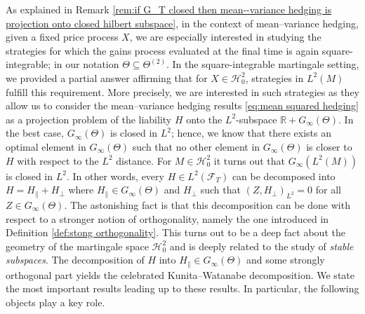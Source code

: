 \documentclass[11pt,a4paper,twoside,openany]{report}
\numberwithin{equation}{section}
\theoremstyle{plain} %
\theoremstyle{definition} %
\theoremstyle{remark} %
\begin{document}
As explained in Remark \ref{rem:if G_T closed then mean--variance hedging is projection onto closed hilbert subspace}, in the context of mean--variance hedging, given a fixed price process \(X\), we are especially interested in studying the strategies for which the gains process evaluated at the final time is again square-integrable; in our notation \(\Theta\subseteq\Theta^{(2)}\). In the square-integrable martingale setting, we provided a partial answer affirming that for \(X\in\mathcal{H}^2_0\), strategies in \(L^2(M)\) fulfill this requirement. More precisely, we are interested in such strategies as they allow us to consider the mean--variance hedging results \eqref{eq:mean squared hedging} as a projection problem of the liability \(H\) onto the \(L^2\)-subspace \(\mathbb{R}+G_\infty(\Theta)\). In the best case, \(G_\infty(\Theta)\) is closed in \(L^2\); hence, we know that there exists an optimal element in \(G_{\infty}(\Theta)\) such that no other element in \(G_{\infty}(\Theta)\) is closer to \(H\) with respect to the \(L^2\) distance. For \(M\in\mathcal{H}^2_0\) it turns out that \(G_{\infty}(L^2(M))\) is closed in \(L^2\). In other words, every \(H\in L^2(\mathcal{F}_T)\) can be decomposed into \(H=H_{\parallel}+H_{\perp}\) where \(H_{\parallel}\in G_{\infty}(\Theta)\) and  \(H_{\perp}\) such that \((Z,H_{\perp})_{L^2}=0\) for all \(Z\in G_\infty(\Theta)\). The astonishing fact is that this decomposition can be done with respect to a stronger notion of orthogonality, namely the one introduced in Definition \ref{def:stong orthogonality}. This turns out to be a deep fact about the geometry of the martingale space \(\mathcal{H}^2_0\) and is deeply related to the study of \textit{stable subspaces}. The decomposition of \(H\) into \(H_{\parallel}\in G_{\infty}(\Theta)\) and some strongly orthogonal part yields the celebrated Kunita–Watanabe decomposition. We state the most important results leading up to these results. In particular, the following objects play a key role.
\end{document}
